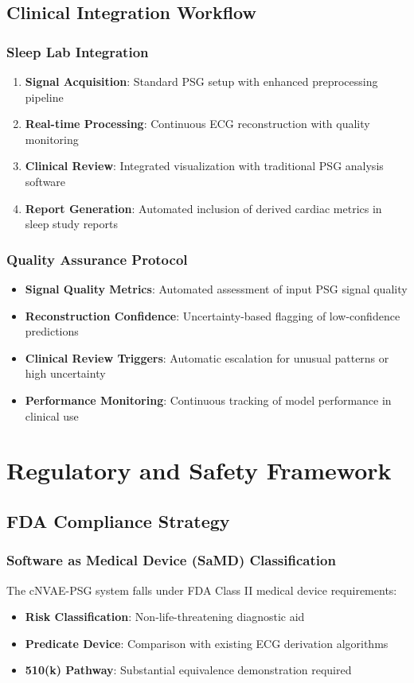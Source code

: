 \documentclass[11pt]{article}
\begin{document}
\subsection{Clinical Integration Workflow}

\subsubsection{Sleep Lab Integration}
\begin{enumerate}
    \item \textbf{Signal Acquisition}: Standard PSG setup with enhanced preprocessing pipeline
    \item \textbf{Real-time Processing}: Continuous ECG reconstruction with quality monitoring
    \item \textbf{Clinical Review}: Integrated visualization with traditional PSG analysis software
    \item \textbf{Report Generation}: Automated inclusion of derived cardiac metrics in sleep study reports
\end{enumerate}

\subsubsection{Quality Assurance Protocol}
\begin{itemize}
    \item \textbf{Signal Quality Metrics}: Automated assessment of input PSG signal quality
    \item \textbf{Reconstruction Confidence}: Uncertainty-based flagging of low-confidence predictions
    \item \textbf{Clinical Review Triggers}: Automatic escalation for unusual patterns or high uncertainty
    \item \textbf{Performance Monitoring}: Continuous tracking of model performance in clinical use
\end{itemize}

\section{Regulatory and Safety Framework}
\label{sec:regulatory}

\subsection{FDA Compliance Strategy}

\subsubsection{Software as Medical Device (SaMD) Classification}
The cNVAE-PSG system falls under FDA Class II medical device requirements:
\begin{itemize}
    \item \textbf{Risk Classification}: Non-life-threatening diagnostic aid
    \item \textbf{Predicate Device}: Comparison with existing ECG derivation algorithms
    \item \textbf{510(k) Pathway}: Substantial equivalence demonstration required
\end{itemize}
\end{document}
